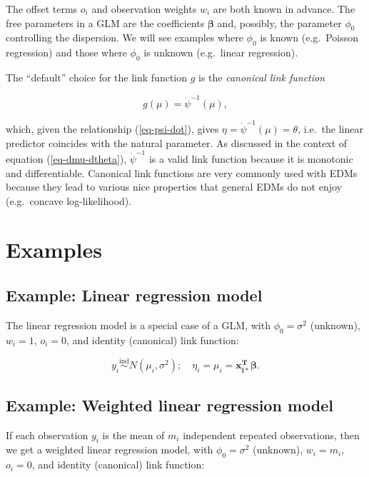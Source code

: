 \documentclass[
  11pt,
  letterpaper,
  oneside]{book}
\theoremstyle{plain}
\theoremstyle{plain}
\theoremstyle{definition}
\theoremstyle{definition}
\theoremstyle{plain}
\theoremstyle{remark}
\begin{document}
The offset terms \(o_i\) and observation weights \(w_i\) are both known
in advance. The free parameters in a GLM are the coefficients
\(\boldsymbol{\beta}\) and, possibly, the parameter \(\phi_0\)
controlling the dispersion. We will see examples where \(\phi_0\) is
known (e.g.~Poisson regression) and those where \(\phi_0\) is unknown
(e.g.~linear regression).

The ``default'' choice for the link function \(g\) is the
\emph{canonical link function}

\[
g(\mu) = \dot \psi^{-1}(\mu),
\]

which, given the relationship (\ref{eq-psi-dot}), gives
\(\eta = \dot \psi^{-1}(\mu) = \theta\), i.e.~the linear predictor
coincides with the natural parameter. As discussed in the context of
equation (\ref{eq-dmu-dtheta}), \(\dot \psi^{-1}\) is a valid link
function because it is monotonic and differentiable. Canonical link
functions are very commonly used with EDMs because they lead to various
nice properties that general EDMs do not enjoy (e.g.~concave
log-likelihood).

\hypertarget{examples-1}{%
\section{Examples}\label{examples-1}}

\hypertarget{example-linear-regression-model}{%
\subsection{Example: Linear regression
model}\label{example-linear-regression-model}}

The linear regression model is a special case of a GLM, with
\(\phi_0 = \sigma^2\) (unknown), \(w_i = 1\), \(o_i = 0\), and identity
(canonical) link function:

\[
y_i \overset{\text{ind}}\sim N(\mu_i, \sigma^2); \quad \eta_i = \mu_i = \boldsymbol{x_{i*}^T} \boldsymbol{\beta}.
\]

\hypertarget{example-weighted-linear-regression-model}{%
\subsection{Example: Weighted linear regression
model}\label{example-weighted-linear-regression-model}}

If each observation \(y_i\) is the mean of \(m_i\) independent repeated
observations, then we get a weighted linear regression model, with
\(\phi_0 = \sigma^2\) (unknown), \(w_i = m_i\), \(o_i = 0\), and
identity (canonical) link function:
\end{document}
